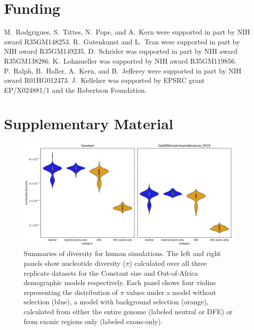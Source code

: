\documentclass[hidelinks]{article}
\newcommand{\beginsupplement}{%
        \fancyhead[L]{Supplemental Material}
        \setcounter{table}{0}
        \renewcommand{\thetable}{S\arabic{table}}%
        \setcounter{figure}{0}
        \renewcommand{\thefigure}{S\arabic{figure}}%
     }
\begin{document}
\section*{Funding}
    \label{funding}
    M.~Rodgrigues, S.~Tittes, N.~Pope, and A.~Kern were supported in part by NIH award R35GM148253.
    R.~Gutenkunst and L.~Tran were supported in part by NIH award R35GM149235.
    D.~Schrider was supported in part by NIH award R35GM138286.
    K.~Lohmueller was supported by NIH award R35GM119856.
    P.~Ralph, B.~Haller, A.~Kern, and B.~Jefferey
    were supported in part by NIH award R01HG012473.
    J.~Kelleher was supported by EPSRC grant EP/X024881/1
    and the Robertson Foundation.


\printbibliography

\clearpage
\beginsupplement

\section*{Supplementary Material}

\begin{figure}[h]
    \centering
    \includegraphics[width=\textwidth]{figures/HomSap/summary_stats.png}
    \caption{
    \label{fig:homsap-summary-stats}
    Summaries of diversity for human simulations. The left and right panels show
    nucleotide diversity ($\pi$) calculated over all three replicate datasets
    for the Constant size and Out-of-Africa demographic models respectively.
    Each panel shows four violins representing the distribution of $\pi$ values
    under a model without selection (blue), a model with background selection (orange),
    calculated from either the entire genome (labeled neutral or DFE)
    or from exonic regions only (labeled exons-only).
    }
\end{figure}
\end{document}
